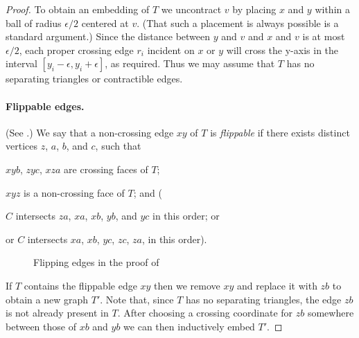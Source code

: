 \documentclass{patmorin}
\begin{document}
\begin{proof}
   To obtain an embedding of $T$ we uncontract $v$ by placing $x$ and $y$
   within a ball of radius $\epsilon/2$ centered at $v$. (That such
   a placement is always possible is a standard argument.)  Since the
   distance between $y$ and $v$ and $x$ and $v$ is at most $\epsilon/2$,
   each proper crossing edge $r_i$ incident on $x$ or $y$ will cross
   the y-axis in the interval $[y_i-\epsilon,y_i+\epsilon]$, as required.
   Thus we may assume that $T$ has no separating triangles or contractible
   edges.


   \paragraph{Flippable edges.}
   (See .)
   We say that a non-crossing edge $xy$ of $T$ is \emph{flippable} if there
   exists distinct vertices $z$, $a$, $b$, and $c$, such that 
   \begin{compactenum}
      \item $xyb$, $zyc$, $xza$ are crossing faces of $T$;
      \item $xyz$ is a non-crossing face of $T$; and (
      \item $C$ intersects $za$, $xa$, $xb$, $yb$, and $yc$ in this order; or 
      \item or $C$ intersects $xa$, $xb$, $yc$, $zc$, $za$, in this order).  
   \end{compactenum}
   \begin{figure}
      \caption{Flipping edges in the proof of
      }
   \end{figure}

   If $T$ contains the flippable edge $xy$ then we remove $xy$ and replace
   it with $zb$ to obtain a new graph $T'$.  Note that, since $T$ has
   no separating triangles, the edge $zb$ is not already present in $T$.
   After choosing a crossing coordinate for $zb$ somewhere between those
   of $xb$ and $yb$ we can then inductively embed $T'$.


\end{proof}
\end{document}
